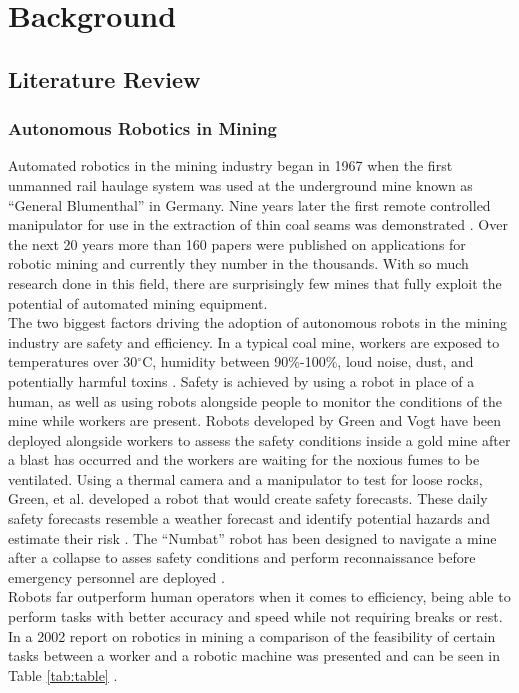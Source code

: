 \chapter{Background}
\label{chap:background}
\section{Literature Review}
\subsection{Autonomous Robotics in Mining}
Automated robotics in the mining industry began in 1967 when the first unmanned rail haulage system was used at the underground mine known as ``General Blumenthal'' in Germany. Nine years later the first remote controlled manipulator for use in the extraction of thin coal seams was demonstrated \cite{mani}. Over the next 20 years more than 160 papers were published on applications for robotic mining and currently they number in the thousands. With so much research done in this field, there are surprisingly few mines that fully exploit the potential of automated mining equipment.\\

The two biggest factors driving the adoption of autonomous robots in the mining industry are safety and efficiency. In a typical coal mine, workers are exposed to temperatures over 30$^\circ$C, humidity between 90\%-100\%, loud noise, dust, and potentially harmful toxins \cite{temp}. Safety is achieved by using a robot in place of a human, as well as using robots alongside people to monitor the conditions of the mine while workers are present. Robots developed by Green \cite{green} and Vogt \cite{vogt} have been deployed alongside workers to assess the safety conditions inside a gold mine after a blast has occurred and the workers are waiting for the noxious fumes to be ventilated. Using a thermal camera and a manipulator to test for loose rocks, Green, et al. developed a robot that would create safety forecasts. These daily safety forecasts resemble a weather forecast and identify potential hazards and estimate their risk \cite{greener}. The ``Numbat'' robot has been designed to navigate a mine after a collapse to asses safety conditions and perform reconnaissance before emergency personnel are deployed \cite{numbat2}.\\

Robots far outperform human operators when it comes to efficiency, being able to perform tasks with better accuracy and speed while not requiring breaks or rest. In a 2002 report on robotics in mining a comparison of the feasibility of certain tasks between a worker and a robotic machine was presented and can be seen in Table \ref{tab:table} \cite{table}.\\

